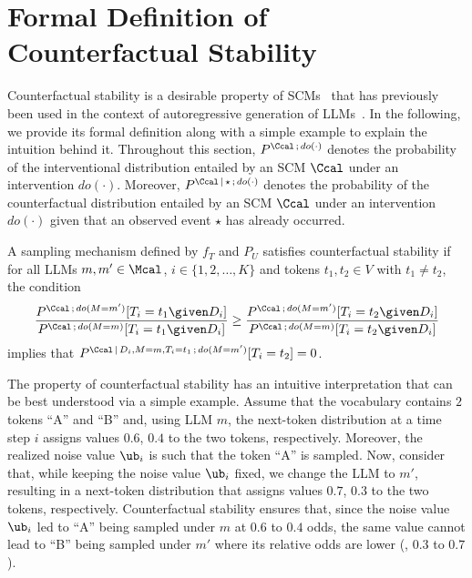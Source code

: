 \section{Formal Definition of Counterfactual Stability}\label{app:stability}

Counterfactual stability is a desirable property of SCMs~\citep{oberst2019counterfactual} that has previously been used in the context of autoregressive generation of LLMs~\cite{chatzi2024counterfactual}. In the following, we provide its formal definition along with a simple example to explain the intuition behind it. Throughout this section, $\PP^{\Ccal \,;\, do(\cdot)}$ denotes the probability of the interventional distribution entailed by an SCM $\Ccal$ under an intervention $do(\cdot)$.
Moreover, $\PP^{\Ccal \,|\, \star \,;\, do(\cdot)}$ denotes the probability of the counterfactual distribution entailed by an SCM $\Ccal$ under an intervention $do(\cdot)$ given that an observed event $\star$ has already occurred.

\begin{definition}
    A sampling mechanism defined by $f_T$ and $P_U$ satisfies counterfactual stability if for all LLMs $m,m'\in \Mcal$, $i\in\{1,2,\ldots,K\}$ and tokens $t_1,t_2 \in V$ with $t_1\neq t_2$, the condition 
    \begin{equation}\label{eq:stability_condition}
        \frac{\PP^{\Ccal \,;\, do(M=m')}[T_i=t_1 \given D_i]}{\PP^{\Ccal \,;\, do(M=m)}[T_i=t_1 \given D_i]} \geq \frac{\PP^{\Ccal \,;\, do(M=m')}[T_i=t_2 \given D_i]}{\PP^{\Ccal \,;\, do(M=m)}[T_i=t_2 \given D_i]}
    \end{equation}
    implies that $\PP^{\Ccal \,|\, D_i,M=m,T_i=t_1 \,;\, do(M=m')}[T_i=t_2]=0$.
\end{definition}

The property of counterfactual stability has an intuitive interpretation that can be best understood via a simple example. Assume that the vocabulary contains $2$ tokens ``A'' and ``B'' and, using LLM $m$, the next-token distribution at a time step $i$ assigns values $0.6$, $0.4$ to the two tokens, respectively. Moreover, the realized noise value $\ub_i$ is such that the token ``A'' is sampled.
Now, consider that, while keeping the noise value $\ub_i$ fixed, we change the LLM to $m'$, resulting in a next-token distribution that assigns values $0.7$, $0.3$ to the two tokens, respectively. Counterfactual stability ensures that, since the noise value $\ub_i$ led to ``A'' being sampled under $m$ at $0.6$ to $0.4$ odds, the same value
cannot lead to ``B'' being sampled under $m'$ where its relative odds are lower (\ie, $0.3$ to $0.7$).

